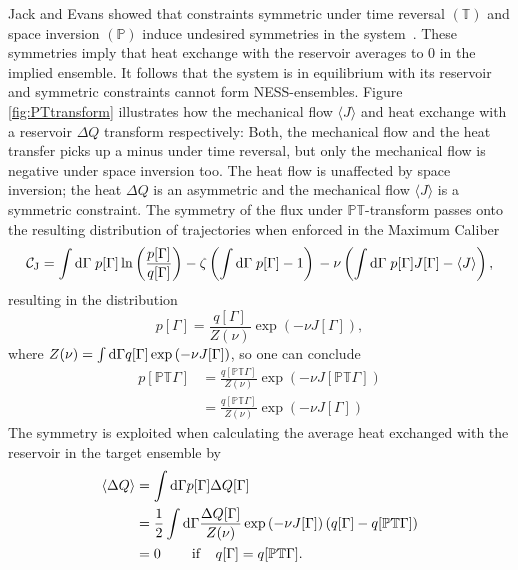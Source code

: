 Jack and Evans showed that constraints symmetric under time reversal $(\mathbb{T})$ and space inversion $(\mathbb{P})$  induce undesired symmetries in the system~\cite{jack2016absence}.  These symmetries imply that heat exchange with the reservoir averages to 0 in the implied ensemble. It follows that the system is in equilibrium with its reservoir and symmetric constraints cannot form NESS-ensembles. Figure \ref{fig:PTtransform} illustrates how the mechanical flow $\langle J \rangle$ and heat exchange with a reservoir $\Delta Q$ transform  respectively: Both, the mechanical flow and the heat transfer picks up a minus under time reversal, but only the mechanical flow is negative under space inversion too. The heat flow is unaffected by space inversion; the  heat $\Delta Q$ is an asymmetric and the mechanical flow $\langle J \rangle$ is a symmetric constraint. The symmetry of the flux under $\mathbb{PT}$-transform passes onto the resulting distribution of trajectories when enforced in the Maximum Caliber
\begin{equation}
    \mathcal{C_{\text{J}}} = \int \mathop{}\!\mathrm{d} \Gamma \; p[\Gamma] \ln \left ( \frac{ p[\Gamma]}{q[\Gamma]} \right )  
- \zeta \left ( \int \mathop{}\!\mathrm{d} \Gamma \; p[\Gamma] - 1 \right ) \\
- \nu \left( \int \mathop{}\!\mathrm{d} \Gamma \; p[\Gamma] J[\Gamma] - \langle J \rangle \right),
\end{equation}
resulting in the distribution
\begin{equation}
    p[\Gamma] = \frac{q[\Gamma]}{Z(\nu)} \exp \left ( -\nu J[\Gamma]  \right ) ,
    \label{eq:LDT}
\end{equation}
where $Z(\nu) = \int \mathop{}\!\mathrm{d} \Gamma q[\Gamma] \exp \left ( -\nu J[\Gamma]  \right ) $,
so one can conclude 
\begin{equation}
    \begin{aligned}
  p[ \mathbb{PT} \Gamma] &= \frac{q[\mathbb{PT} \Gamma]}{Z(\nu)} \exp \left ( -\nu J[\mathbb{PT} \Gamma]  \right )\\
  &= \frac{  q[\mathbb{PT} \Gamma]}{Z(\nu)} \exp \left ( -\nu J[ \Gamma]  \right )
\end{aligned}
\end{equation}
The symmetry is exploited when 
calculating the average heat exchanged with the reservoir in the target ensemble by
\begin{equation}
 \begin{aligned}
  \langle \Delta Q \rangle &= \int \mathop{}\!\mathrm{d} \Gamma p[\Gamma] \Delta Q[\Gamma] \\
  &= \frac{1}{2}\int \mathop{}\!\mathrm{d} \Gamma \frac{\Delta Q[\Gamma]}{Z(\nu)} 
  \exp \left ( -\nu J[\Gamma] \right ) \left ( q[\Gamma] - q[\mathbb{PT} \Gamma] \right ) \\
  &= 0 \;\;\;\;\;\;\;\; \text{if} \;\;\;\; q[\Gamma] = q[\mathbb{PT} \Gamma].
\end{aligned}
\end{equation}
